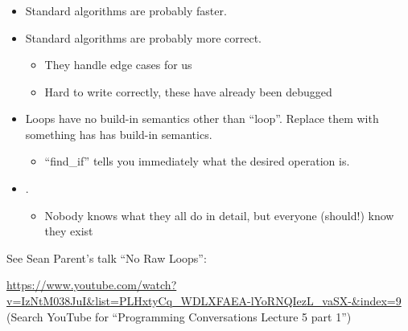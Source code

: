 \begin{frame}[fragile]
\frametitle{}
\begin{itemize}[<+->]
\item Standard algorithms are probably faster.
\item Standard algorithms are probably more correct.
  \begin{itemize}
    \item They handle edge cases for us
    \item Hard to write correctly, these have already been debugged
  \end{itemize}
\item Loops have no build-in semantics other than ``loop''.  Replace
  them with something has has build-in semantics.
  \begin{itemize}
    \item ``find\_if'' tells you immediately what the desired
      operation is.
  \end{itemize}
\item {}.
  \begin{itemize}
    \item Nobody knows what they all do in detail, but everyone
      (should!) know they exist
  \end{itemize}
\end{itemize}

\pause{}
See Sean Parent's talk ``No Raw Loops'':

\url{https://www.youtube.com/watch?v=IzNtM038JuI&list=PLHxtyCq_WDLXFAEA-lYoRNQIezL_vaSX-&index=9}
(Search YouTube for ``Programming Conversations Lecture 5 part 1'')

\begin{center}
\end{center}

\end{frame}
